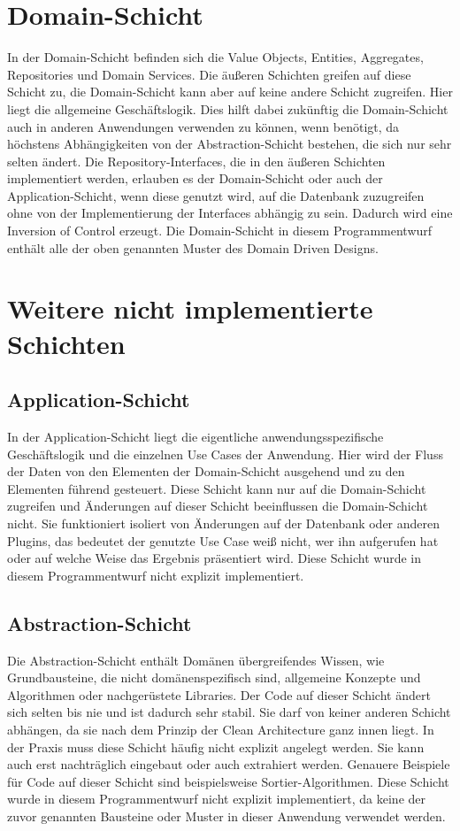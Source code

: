 \section{Domain-Schicht}
In der Domain-Schicht befinden sich die Value Objects, Entities, Aggregates, Repositories und Domain Services. Die äußeren Schichten greifen auf diese Schicht zu, die Domain-Schicht kann aber auf keine andere Schicht zugreifen. Hier liegt die allgemeine Geschäftslogik. 
Dies hilft dabei zukünftig die Domain-Schicht auch in anderen Anwendungen verwenden zu können, wenn benötigt, da höchstens Abhängigkeiten von der Abstraction-Schicht bestehen, die sich nur sehr selten ändert. Die Repository-Interfaces, die in den äußeren Schichten implementiert werden, erlauben es der Domain-Schicht oder auch der Application-Schicht, wenn diese genutzt wird, auf die Datenbank zuzugreifen 
ohne von der Implementierung der Interfaces abhängig zu sein. Dadurch wird eine Inversion of Control erzeugt.
\newline Die Domain-Schicht in diesem Programmentwurf enthält alle der oben genannten Muster des Domain Driven Designs. 
\section{Weitere nicht implementierte Schichten}
\subsection{Application-Schicht}
In der Application-Schicht liegt die eigentliche anwendungsspezifische Geschäftslogik und die einzelnen Use Cases der Anwendung. Hier wird der Fluss der Daten von den Elementen der Domain-Schicht ausgehend und zu den Elementen führend gesteuert. 
Diese Schicht kann nur auf die Domain-Schicht zugreifen und Änderungen auf dieser Schicht beeinflussen die Domain-Schicht nicht. Sie funktioniert isoliert von Änderungen auf der Datenbank oder anderen Plugins, das bedeutet der genutzte Use Case weiß nicht, wer ihn aufgerufen hat oder auf 
welche Weise das Ergebnis präsentiert wird.
\newline Diese Schicht wurde in diesem Programmentwurf nicht explizit implementiert.
\subsection{Abstraction-Schicht}
Die Abstraction-Schicht enthält Domänen übergreifendes Wissen, wie Grundbausteine, die nicht domänenspezifisch sind, allgemeine Konzepte und Algorithmen oder nachgerüstete Libraries. Der Code auf dieser Schicht ändert sich selten bis nie und ist dadurch sehr stabil. Sie darf von keiner anderen Schicht abhängen, da 
sie nach dem Prinzip der Clean Architecture ganz innen liegt. In der Praxis muss diese Schicht häufig nicht explizit angelegt werden. Sie kann auch erst nachträglich eingebaut oder auch extrahiert werden. Genauere Beispiele für Code auf dieser Schicht sind beispielsweise Sortier-Algorithmen.
\newline Diese Schicht wurde in diesem Programmentwurf nicht explizit implementiert, da keine der zuvor genannten Bausteine oder Muster in dieser Anwendung verwendet werden.
